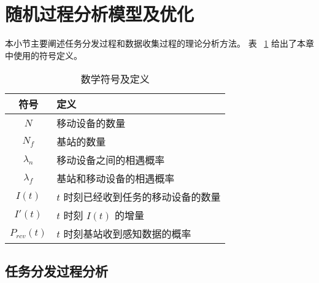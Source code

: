

\section{随机过程分析模型及优化}
本小节主要阐述任务分发过程和数据收集过程的理论分析方法。
表 ~\ref{table_notations_UIC} 给出了本章中使用的符号定义。

\begin{table}[h]
  \vspace{-1.5em}
  \caption{数学符号及定义}
  \vspace{-0.5em}
  \centering
  \label{table_notations_UIC}
  \begin{tabular}{|c|p{7cm}|}
  \hline
  \textbf{符号} & \textbf{定义}\\
  \hline
  $N$ & 移动设备的数量\\\hline
  $N_f$ & 基站的数量\\\hline
  $\lambda_n$ & 移动设备之间的相遇概率\\\hline
  $\lambda_f$ & 基站和移动设备的相遇概率\\\hline
  $I(t)$ & $t$ 时刻已经收到任务的移动设备的数量\\\hline
  $I'(t)$ & $t$ 时刻 $I(t)$ 的增量\\\hline
  $P_{rcv}(t)$ & $t$ 时刻基站收到感知数据的概率\\\hline
  \end{tabular}
  \vspace{-1em}
\end{table}

\subsection{任务分发过程分析}

